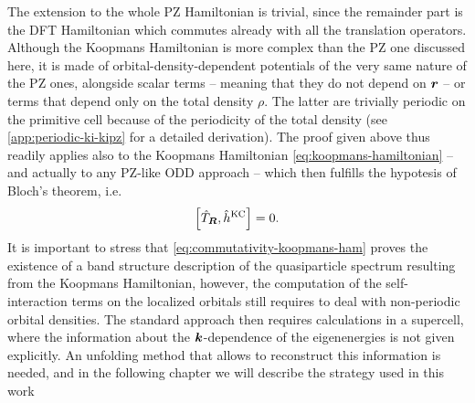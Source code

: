 The extension to the whole PZ Hamiltonian is trivial, since the remainder part is the DFT Hamiltonian which commutes already with all the translation operators. Although the Koopmans Hamiltonian is more complex than the PZ one discussed here, it is made of orbital-density-dependent potentials of the very same nature of the PZ ones, alongside scalar terms -- meaning that they do not depend on ${\bm r}$ -- or terms that depend only on the total density $\rho$. The latter are trivially periodic on the primitive cell because of the periodicity of the total density (see \cref{app:periodic-ki-kipz} for a detailed derivation). The proof given above thus readily applies also to the Koopmans Hamiltonian \eqref{eq:koopmans-hamiltonian} -- and actually to any PZ-like ODD approach -- which then fulfills the hypotesis of Bloch's theorem, i.e.
%
\begin{equation}
    \left[ \hat{T}_{{\bm R}}, \hat{h}^{\rm KC} \right] = 0 .
    \label{eq:commutativity-koopmans-ham}
\end{equation}
%
It is important to stress that \cref{eq:commutativity-koopmans-ham} proves the existence of a band structure description of the quasiparticle spectrum resulting from the Koopmans Hamiltonian, however, the computation of the self-interaction terms on the localized orbitals still requires to deal with non-periodic orbital densities. The standard approach then requires calculations in a supercell, where the information about the ${\bm k}$-dependence of the eigenenergies is not given explicitly. An unfolding method that allows to reconstruct this information is needed, and in the following chapter we will describe the strategy used in this work

